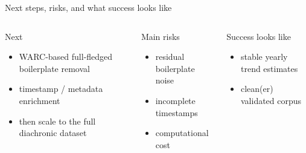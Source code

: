 \documentclass[11pt,notheorems,aspectratio=169]{beamer}
\begin{document}
	\begin{frame}{Next steps, risks, and what success looks like}
		\begin{columns}[T,onlytextwidth]
			\begin{block}{Next}
				\begin{itemize}
					\item WARC-based full-fledged boilerplate removal
					\item timestamp / metadata enrichment
					\item then scale to the full diachronic dataset
				\end{itemize}
			\end{block}
			
			\begin{block}{Main risks}
				\begin{itemize}
					\item residual boilerplate noise
					\item incomplete timestamps
					\item computational cost
				\end{itemize}
			\end{block}
			
			\begin{exampleblock}{Success looks like}
				\begin{itemize}
					\item stable yearly trend estimates
					\item clean(er) validated corpus
				\end{itemize}
			\end{exampleblock}
		\end{columns}
	\end{frame}
	
\end{document}
